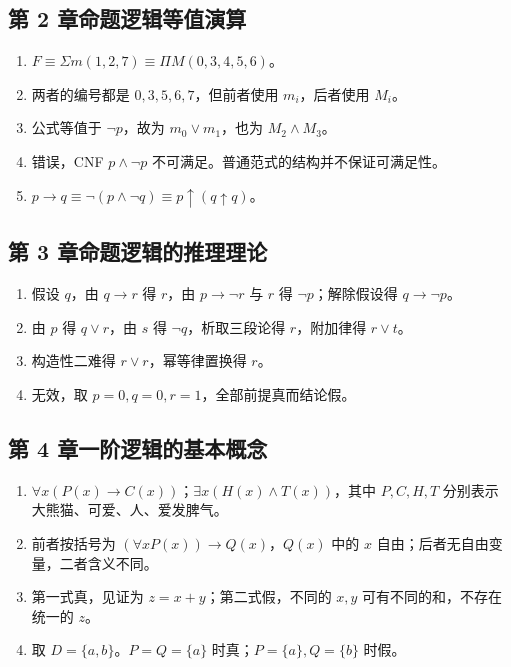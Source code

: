\documentclass[UTF8,fontset=none,zihao=-4,a4paper]{ctexart}
\begin{document}
\subsection*{第 2 章\quad 命题逻辑等值演算}
\begin{enumerate}[label=2.\arabic*.,leftmargin=2.8em]
\item $F\equiv\Sigma m(1,2,7)\equiv\Pi M(0,3,4,5,6)$。

\item 两者的编号都是 $0,3,5,6,7$，但前者使用 $m_i$，后者使用 $M_i$。

\item 公式等值于 $\neg p$，故为 $m_0\lor m_1$，也为 $M_2\land M_3$。

\item 错误，CNF $p\land\neg p$ 不可满足。普通范式的结构并不保证可满足性。

\item $p\to q\equiv\neg(p\land\neg q)\equiv p\uparrow(q\uparrow q)$。
\end{enumerate}

\subsection*{第 3 章\quad 命题逻辑的推理理论}
\begin{enumerate}[label=3.\arabic*.,leftmargin=2.8em]
\item 假设 $q$，由 $q\to r$ 得 $r$，由 $p\to\neg r$ 与 $r$ 得 $\neg p$；解除假设得 $q\to\neg p$。

\item 由 $p$ 得 $q\lor r$，由 $s$ 得 $\neg q$，析取三段论得 $r$，附加律得 $r\lor t$。

\item 构造性二难得 $r\lor r$，幂等律置换得 $r$。

\item 无效，取 $p=0,q=0,r=1$，全部前提真而结论假。
\end{enumerate}

\subsection*{第 4 章\quad 一阶逻辑的基本概念}
\begin{enumerate}[label=4.\arabic*.,leftmargin=2.8em]
\item $\forall x(P(x)\to C(x))$；$\exists x(H(x)\land T(x))$，其中 $P,C,H,T$ 分别表示大熊猫、可爱、人、爱发脾气。

\item 前者按括号为 $(\forall xP(x))\to Q(x)$，$Q(x)$ 中的 $x$ 自由；后者无自由变量，二者含义不同。

\item 第一式真，见证为 $z=x+y$；第二式假，不同的 $x,y$ 可有不同的和，不存在统一的 $z$。

\item 取 $D=\{a,b\}$。$P=Q=\{a\}$ 时真；$P=\{a\},Q=\{b\}$ 时假。
\end{enumerate}
\end{document}
